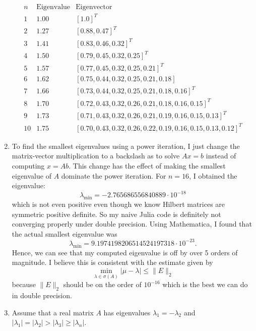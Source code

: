 \documentclass[a4paper,12pt]{article}
\newcommand{\abs}[1]{\left| #1 \right|}
\newcommand{\norm}[1]{\lVert #1 \rVert}
\begin{document}
\begin{enumerate}[label = (\arabic*)]
	\[
		\begin{array}{rcl}
			n  & \text{Eigenvalue} & \text{Eigenvector} \\
			1  & 1.00 & [1.0]^T \\
			2  & 1.27 & [0.88, 0.47]^T \\
			3  & 1.41 & [0.83, 0.46, 0.32]^T \\
			4  & 1.50 & [0.79, 0.45, 0.32, 0.25]^T \\
			5  & 1.57 & [0.77, 0.45, 0.32, 0.25, 0.21]^T \\
			6  & 1.62 & [0.75, 0.44, 0.32, 0.25, 0.21, 0.18] \\
			7  & 1.66 & [0.73, 0.44, 0.32, 0.25, 0.21, 0.18, 0.16]^T \\
			8  & 1.70 & [0.72, 0.43, 0.32, 0.26, 0.21, 0.18, 0.16, 0.15]^T \\
			9  & 1.73 & [0.71, 0.43, 0.32, 0.26, 0.21, 0.19, 0.16, 0.15, 0.13]^T \\
			10 & 1.75 & [0.70, 0.43, 0.32, 0.26, 0.22, 0.19, 0.16, 0.15, 0.13, 0.12]^T
		\end{array}
	\]
	
	\newpage
	\item To find the smallest eigenvalues using a power iteration, I just change the matrix-vector multiplication to a backslash as to solve $ Ax = b $ instead of computing $ x = Ab $. This change has the effect of making the smallest eigenvalue of $ A $ dominate the power iteration. For $ n = 16 $, I obtained the eigenvalue:
	\[
		\lambda_{\min} = -2.765686556840889 \cdot 10^{-18}
	\]
	which is not even positive even though we know Hilbert matrices are symmetric positive definite. So my naive Julia code is definitely not converging properly under double precision. Using Mathematica, I found that the actual smallest eigenvalue was
	\[
		\lambda_{\min} = 9.1974198206514524197318 \cdot 10^{-23}.
	\]
	Hence, we can see that my computed eigenvalue is off by over 5 orders of magnitude. I believe this is consistent with the estimate given by
	\[
		\min_{\lambda \in \sigma(A)} \abs{\mu - \lambda} \leq \norm{E}_2
	\]
	because $ \norm{E}_2 $ should be on the order of $ 10^{-16} $ which is the best we can do in double precision. 
	
	\newpage
	\item Assume that a real matrix $ A $ has eigenvalues $ \lambda_1 = -\lambda_2 $ and $ \abs{\lambda_1} = \abs{\lambda_2} > \abs{\lambda_3} \geq \abs{\lambda_n} $. 
	

\end{enumerate}
\end{document}
